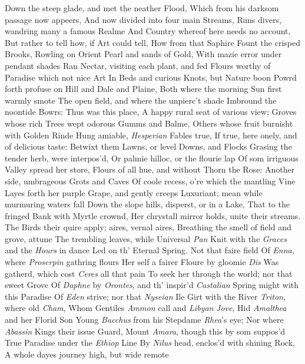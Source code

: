 \documentclass[11pt]{book}
\newcounter {first}
\begin{document}
Down the steep glade, and met the neather Flood, 
Which from his darksom passage now appeers, 
And now divided into four main Streams, 
Runs divers, wandring many a famous Realme 
And Country whereof here needs no account, 
But rather to tell how, if Art could tell, 
How from that Saphire Fount the crisped Brooks, 
Rowling on Orient Pearl and sands of Gold, 
With mazie error under pendant shades 
Ran Nectar, visiting each plant, and fed 
Flours worthy of Paradise which not nice Art 
In Beds and curious Knots, but Nature boon 
Powrd forth profuse on Hill and Dale and Plaine, 
Both where the morning Sun first warmly smote 
The open field, and where the unpierc't shade 
Imbround the noontide Bowrs: Thus was this place, 
A happy rural seat of various view; 
Groves whose rich Trees wept odorous Gumms and Balme, 
Others whose fruit burnisht with Golden Rinde 
Hung amiable, \textit{Hesperian} Fables true, 
If true, here onely, and of delicious taste: 
Betwixt them Lawns, or level Downs, and Flocks 
Grasing the tender herb, were interpos'd, 
Or palmie hilloc, or the flourie lap 
Of som irriguous Valley spread her store, 
Flours of all hue, and without Thorn the Rose: 
Another side, umbrageous Grots and Caves 
Of coole recess, o're which the mantling Vine 
Layes forth her purple Grape, and gently creeps 
Luxuriant; mean while murmuring waters fall 
Down the slope hills, disperst, or in a Lake, 
That to the fringed Bank with Myrtle crownd, 
Her chrystall mirror holds, unite their streams. 
The Birds their quire apply; aires, vernal aires, 
Breathing the smell of field and grove, attune 
The trembling leaves, while Universal \textit{Pan} 
Knit with the \textit{Graces} and the \textit{Hours} in dance 
Led on th' Eternal Spring.  Not that faire field 
Of \textit{Enna}, where \textit{Proserpin} gathring flours 
Her self a fairer Floure by gloomie \textit{Dis} 
Was gatherd, which cost \textit{Ceres} all that pain 
To seek her through the world; nor that sweet Grove 
Of \textit{Daphne} by \textit{Orontes}, and th' inspir'd 
\textit{Castalian} Spring might with this Paradise 
Of \textit{Eden} strive; nor that \textit{Nyseian} Ile 
Girt with the River \textit{Triton}, where old \textit{Cham}, 
Whom Gentiles \textit{Ammon} call and \textit{Libyan} \textit{Jove}, 
Hid \textit{Amalthea} and her Florid Son 
Young \textit{Bacchus} from his Stepdame \textit{Rhea}'s eye; 
Nor where \textit{Abassin} Kings their issue Guard, 
Mount \textit{Amara}, though this by som suppos'd 
True Paradise under the \textit{Ethiop} Line 
By \textit{Nilus} head, enclos'd with shining Rock, 
A whole dayes journey high, but wide remote 
\end{document}
